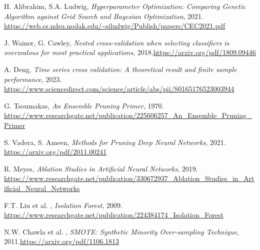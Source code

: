 \documentclass[a4paper,12pt]{report}
\begin{document}
\begin{thebibliography}{99}
		H. Alibrahim, S.A. Ludwig, \emph{Hyperparameter Optimization: Comparing Genetic Algorithm against Grid Search and Bayesian Optimization}, 2021. \url{https://web.cs.ndsu.nodak.edu/~siludwig/Publish/papers/CEC2021.pdf}
		 
		J. Wainer, G. Cawley, \emph{Nested cross-validation when selecting classifiers is overzealous for most practical applications}, 2018.\url{https://arxiv.org/pdf/1809.09446}
		 
		A. Deng, \emph{Time series cross validation: A theoretical result and finite sample performance}, 2023. \url{https://www.sciencedirect.com/science/article/abs/pii/S0165176523003944}
		 
		G. Tsoumakas, \emph{An Ensemble Pruning Primer}, 1970. \url{https://www.researchgate.net/publication/225606257_An_Ensemble_Pruning_Primer}
		 
		S. Vadera, S. Ameen, \emph{Methods for Pruning Deep Neural Networks}, 2021. \url{https://arxiv.org/pdf/2011.00241}
		
		R. Meyes, \emph{Ablation Studies in Artificial Neural Networks}, 2019. \url{https://www.researchgate.net/publication/330672937_Ablation_Studies_in_Artificial_Neural_Networks}
		
		F.T. Liu et al. , \emph{Isolation Forest}, 2009. \url{https://www.researchgate.net/publication/224384174_Isolation_Forest}
		
		N.W. Chawla et al. , \emph{SMOTE: Synthetic Minority Over-sampling Technique}, 2011.\url{https://arxiv.org/pdf/1106.1813}
	\end{thebibliography}
		
\end{document}
